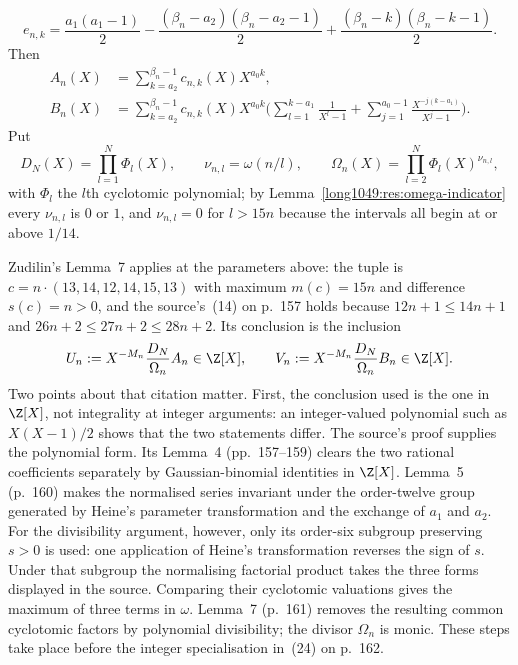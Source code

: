 \[
 e_{n,k}=\frac{a_1(a_1-1)}2-\frac{(\beta_n-a_2)(\beta_n-a_2-1)}2
 +\frac{(\beta_n-k)(\beta_n-k-1)}2 .
\]
Then
\begin{align}
 A_n(X)&=\sum_{k=a_2}^{\beta_n-1}c_{n,k}(X)X^{a_0k},\label{long1049:eq:A-explicit}\\
 B_n(X)&=\sum_{k=a_2}^{\beta_n-1}c_{n,k}(X)X^{a_0k}
 \biggl(\sum_{l=1}^{k-a_1}\frac1{X^{l}-1}
 +\sum_{j=1}^{a_0-1}\frac{X^{-j(k-a_1)}}{X^{j}-1}\biggr).\label{long1049:eq:B-explicit}
\end{align}
Put
\begin{equation}\label{long1049:eq:cyclotomic-products}
 D_N(X)=\prod_{l=1}^{N}\Phi_l(X),\qquad
 \nu_{n,l}=\omega(n/l),\qquad
 \Omega_n(X)=\prod_{l=2}^{N}\Phi_l(X)^{\nu_{n,l}},
\end{equation}
with $\Phi_l$ the $l$th cyclotomic polynomial; by
Lemma~\ref{long1049:res:omega-indicator} every $\nu_{n,l}$ is $0$ or $1$, and
$\nu_{n,l}=0$ for $l>15n$ because the intervals all begin at or above $1/14$.

Zudilin's Lemma~7 \cite[p.~161, (23)]{zudilin2004} applies at the parameters above: the tuple is
$c=n\cdot(13,14,12,14,15,13)$ with maximum $m(c)=15n$ and difference $s(c)=n>0$,
and the source's~(14) on p.~157 holds because $12n+1\le14n+1$ and
$26n+2\le27n+2\le28n+2$.  Its conclusion is the inclusion
\begin{equation}\label{long1049:eq:integer-polynomial-pair}
 U_n:=X^{-M_n}\frac{D_N}{\Omega_n}A_n\in\Z[X],\qquad
 V_n:=X^{-M_n}\frac{D_N}{\Omega_n}B_n\in\Z[X].
\end{equation}
Two points about that citation matter.  First, the conclusion used is the one
in $\Z[X]$, not integrality at integer arguments: an integer-valued polynomial
such as $X(X-1)/2$ shows that the two statements differ.  The source's proof supplies the polynomial form. Its Lemma~4
(pp.~157--159) clears the two rational coefficients separately by
Gaussian-binomial identities in $\Z[X]$. Lemma~5 (p.~160) makes the
normalised series invariant under the order-twelve group generated by
Heine's parameter transformation and the exchange of $a_1$ and $a_2$.
For the divisibility argument, however, only its order-six subgroup
preserving $s>0$ is used: one application of Heine's transformation
reverses the sign of $s$. Under that subgroup the normalising factorial
product takes the three forms displayed in the source. Comparing their cyclotomic
valuations gives the maximum of three terms in $\omega$.
Lemma~7 (p.~161) removes the resulting common cyclotomic factors by
polynomial divisibility; the divisor $\Omega_n$ is monic. These steps
take place before the integer specialisation in~(24) on p.~162.

